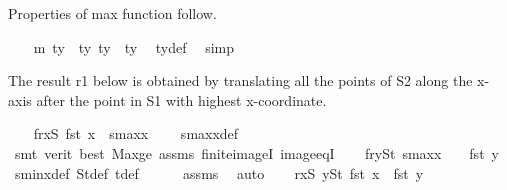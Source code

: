 \begin{isabellebody}
\begin{isamarkuptext}%
Properties of max function follow.%
\end{isamarkuptext}\isamarkuptrue%
\ \ \isamarkupfalse%
\ m{}{\isacharcolon}{\kern0pt}\ {\isachardoublequoteopen}ty\ {\isasymge}\ ty{}{\isachardoublequoteclose}\ {\isachardoublequoteopen}ty\ {\isasymge}\ ty{}{\isachardoublequoteclose}\ \isamarkupfalse%
\ ty{\isacharunderscore}{\kern0pt}def\ \isamarkupfalse%
\ simp{\isacharplus}{\kern0pt}%
\begin{isamarkuptext}%
The result r1 below is obtained by translating all the points of S2 along the x-axis
        after the point in S1 with highest x-coordinate.%
\end{isamarkuptext}\isamarkuptrue%
\ \ \isamarkupfalse%
\ f{}r{}{\isacharcolon}{\kern0pt}{\isachardoublequoteopen}{\isasymforall}x{\isasymin}S{}{\isachardot}{\kern0pt}\ fst\ x\ {\isacharless}{\kern0pt}\ s{}{\isacharunderscore}{\kern0pt}maxx\ {\isacharplus}{\kern0pt}\ {}{\isachardoublequoteclose}\ \isamarkupfalse%
\ s{}{\isacharunderscore}{\kern0pt}maxx{\isacharunderscore}{\kern0pt}def\isanewline
\ \ \ \ \isamarkupfalse%
\ {\isacharparenleft}{\kern0pt}smt\ {\isacharparenleft}{\kern0pt}verit{\isacharcomma}{\kern0pt}\ best{\isacharparenright}{\kern0pt}\ Max{\isacharunderscore}{\kern0pt}ge\ assms{\isacharparenleft}{\kern0pt}{}{\isacharparenright}{\kern0pt}\ finite{\isacharunderscore}{\kern0pt}imageI\ image{\isacharunderscore}{\kern0pt}eqI{\isacharparenright}{\kern0pt}\isanewline
\ \ \isamarkupfalse%
\ f{}r{}{\isacharcolon}{\kern0pt}{\isachardoublequoteopen}{\isasymforall}y{\isasymin}S{}t{\isachardot}{\kern0pt}\ s{}{\isacharunderscore}{\kern0pt}maxx\ {\isacharplus}{\kern0pt}\ {}\ {\isasymle}\ fst\ y{\isachardoublequoteclose}\ \isamarkupfalse%
\ s{}{\isacharunderscore}{\kern0pt}minx{\isacharunderscore}{\kern0pt}def\ S{}t{\isacharunderscore}{\kern0pt}def\ t{\isacharunderscore}{\kern0pt}def\isanewline
\ \ \ \ \isamarkupfalse%
\ assms{\isacharparenleft}{\kern0pt}{}{\isacharparenright}{\kern0pt}\ \isamarkupfalse%
\ auto\isanewline
\ \ \isamarkupfalse%
\ r{}{\isacharcolon}{\kern0pt}{\isachardoublequoteopen}{\isacharparenleft}{\kern0pt}{\isasymforall}x{\isasymin}S{}{\isachardot}{\kern0pt}\ {\isasymforall}y{\isasymin}S{}t{\isachardot}{\kern0pt}\ fst\ x\ {\isacharless}{\kern0pt}\ fst\ y{\isacharparenright}{\kern0pt}{\isachardoublequoteclose}\ \isamarkupfalse%

\end{isabellebody}
